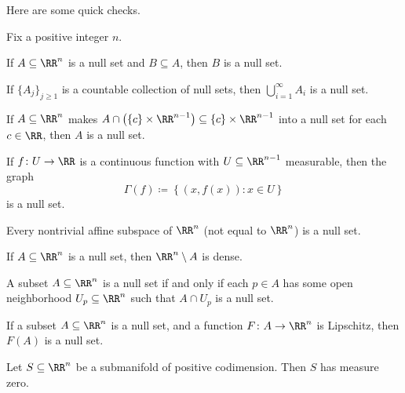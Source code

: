 \documentclass[../notes.tex]{subfiles}
\begin{document}
Here are some quick checks.
\begin{lemma} \label{lem:null-set-checks}
	Fix a positive integer $n$.
	\begin{listalph}
		\item If $A\subseteq\RR^n$ is a null set and $B\subseteq A$, then $B$ is a null set.
		\item If $\{A_j\}_{j\ge1}$ is a countable collection of null sets, then $\bigcup_{i=1}^\infty A_i$ is a null set.
		\item If $A\subseteq\RR^n$ makes $A\cap\left(\{c\}\times\RR^{n-1}\right)\subseteq\{c\}\times\RR^{n-1}$ into a null set for each $c\in\RR$, then $A$ is a null set.
		\item If $f\colon U\to\RR$ is a continuous function with $U\subseteq\RR^{n-1}$ measurable, then the graph
		\[\Gamma(f)\coloneqq\left\{(x,f(x)):x\in U\right\}\]
		is a null set.
		\item Every nontrivial affine subspace of $\RR^n$ (not equal to $\RR^n$) is a null set.
		\item If $A\subseteq\RR^n$ is a null set, then $\RR^n\setminus A$ is dense.
		\item A subset $A\subseteq\RR^n$ is a null set if and only if each $p\in A$ has some open neighborhood $U_p\subseteq\RR^n$ such that $A\cap U_p$ is a null set.
		\item If a subset $A\subseteq\RR^n$ is a null set, and a function $F\colon A\to\RR^n$ is Lipschitz, then $F(A)$ is a null set.
		\item Let $S\subseteq\RR^n$ be a submanifold of positive codimension. Then $S$ has measure zero.
	\end{listalph}
\end{lemma}
\end{document}
